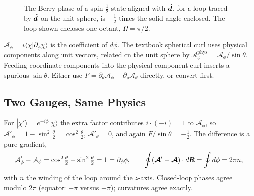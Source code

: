\begin{figure}[ht]
\centering
{}
\caption{The Berry phase of a spin-$\frac12$ state aligned with $\hat{\bm{d}}$, for a loop traced by $\hat{\bm{d}}$ on the unit sphere, is $-\frac12$ times the solid angle enclosed. The loop shown encloses one octant, $\Omega = \pi/2$.}
\label{fig:berry-octant}
\end{figure}

\begin{fact}
$\mathcal{A}_\phi = i\langle\chi|\partial_\phi\chi\rangle$ is the coefficient of $d\phi$. The textbook spherical curl uses physical components along unit vectors, related on the unit sphere by $\mathcal{A}_\phi^{\text{phys}} = \mathcal{A}_\phi/\sin\theta$. Feeding coordinate components into the physical-component curl inserts a spurious $\sin\theta$. Either use $F = \partial_\theta\mathcal{A}_\phi - \partial_\phi\mathcal{A}_\theta$ directly, or convert first.
\end{fact}

\subsection{Two Gauges, Same Physics}

For $|\chi'\rangle = e^{-i\phi}|\chi\rangle$ the extra factor contributes $i\cdot(-i) = 1$ to $\mathcal{A}_\phi$, so $\mathcal{A}'_\phi = 1 - \sin^2\frac\theta2 = \cos^2\frac\theta2$, $\mathcal{A}'_\theta = 0$, and again $F/\sin\theta = -\frac12$. The difference is a pure gradient,
\[
    \mathcal{A}'_\phi - \mathcal{A}_\phi = \cos^2\tfrac\theta2 + \sin^2\tfrac\theta2 = 1 = \partial_\phi\phi,
    \qquad
    \oint(\bm{\mathcal{A}}' - \bm{\mathcal{A}})\cdot d\bm{R} = \oint d\phi = 2\pi n,
\]
with $n$ the winding of the loop around the $z$-axis. Closed-loop phases agree modulo $2\pi$ (equator: $-\pi$ versus $+\pi$); curvatures agree exactly.


